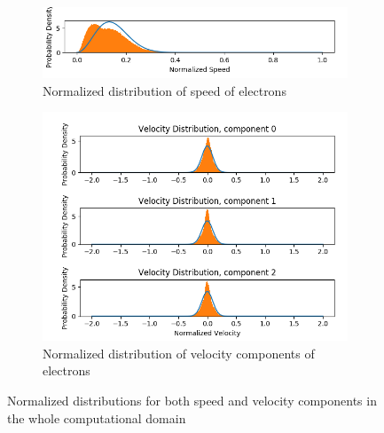 \begin{figure}[H]
  \centering
  \begin{subfigure}[b]{0.75\textwidth}
  \includegraphics[width=\columnwidth]{figures/Appendix/AppendixB/FD/speedElectrons.png}
  \caption{Normalized distribution of speed of electrons}
  \label{fig:appB_FD_speed}
\end{subfigure}

\begin{subfigure}[b]{0.75\textwidth}
  \includegraphics[width=\columnwidth]{figures/Appendix/AppendixB/FD/vel.png}
  \caption{Normalized distribution of velocity components of electrons}
  \label{fig:appB_FD_vel}
\end{subfigure}
\label{fig:appendixBFullDomain}
\caption{Normalized distributions for both speed and velocity components in the whole computational domain}
\end{figure}

